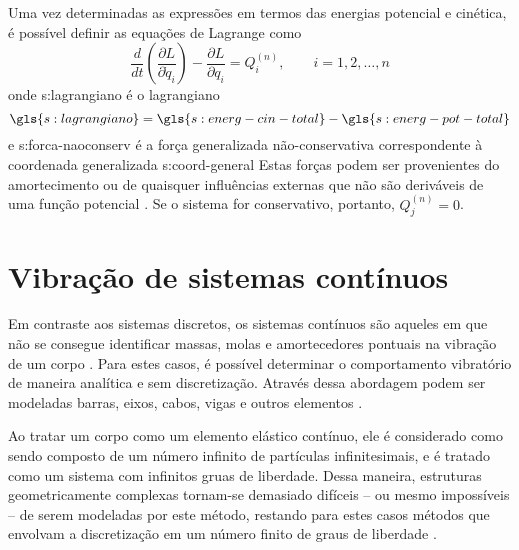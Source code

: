\documentclass[12pt,oneside,english,brazil]{ucsmono}
\begin{document}
	Uma vez determinadas as expressões em termos das energias potencial e cinética, é possível definir as equações de Lagrange como \cite{savi:2017}
	\begin{equation} \label{eqn:lagrange}
		\frac{d}{dt}\left(\frac{\partial L}{\partial \dot{q}_i}\right) - \frac{\partial L}{\partial q_i} = Q_i^{(n)}, \qquad i = 1, 2, \dots, n
	\end{equation}
	onde \gls{s:lagrangiano} é o lagrangiano
	\begin{equation}
		\gls{s:lagrangiano} = \gls{s:energ-cin-total}-\gls{s:energ-pot-total}
	\end{equation}
	e \gls{s:forca-naoconserv} é a força generalizada não-conservativa correspondente à coordenada generalizada \gls{s:coord-general} Estas forças podem ser provenientes do amortecimento ou de quaisquer influências externas que não são deriváveis de uma função potencial \cite{rao:2008}. Se o sistema for conservativo, portanto, $ Q_j^{(n)} = 0 $.
	
	\section{Vibração de sistemas contínuos}
	Em contraste aos sistemas discretos, os sistemas contínuos são aqueles em que não se consegue identificar massas, molas e amortecedores pontuais na vibração de um corpo \cite{rao:2008}. Para estes casos, é possível determinar o comportamento vibratório de maneira analítica e sem discretização. Através dessa abordagem podem ser modeladas barras, eixos, cabos, vigas e outros elementos \cite{timoshenko:1974}. 
	
	Ao tratar um corpo como um elemento elástico contínuo, ele é considerado como sendo composto de um número infinito de partículas infinitesimais, e é tratado como um sistema com infinitos gruas de liberdade. Dessa maneira, estruturas geometricamente complexas tornam-se demasiado difíceis -- ou mesmo impossíveis -- de serem modeladas por este método, restando para estes casos métodos que envolvam a discretização em um número finito de graus de liberdade \cite{timoshenko:1974}.
	
\end{document}
